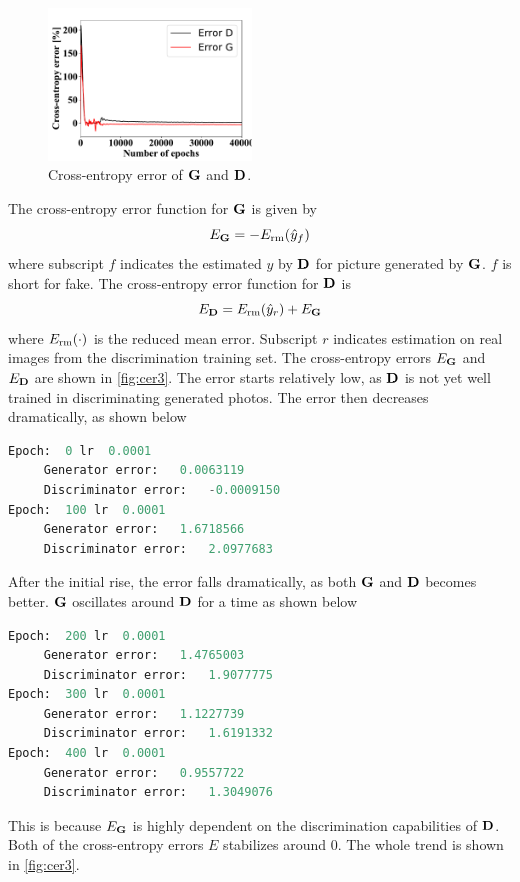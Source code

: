 \documentclass[../main.tex]{subfiles}
\begin{document}
\begin{figure}[t]
	\centering
    \includegraphics[width=0.48\textwidth]{figures/wgan/cross_entropy_error.pdf}
    \caption{Cross-entropy error of $\mathbf{G}$ and $\mathbf{D}$.}
    \label{fig:cer3}
\end{figure}

The cross-entropy error function for $\mathbf{G}$ is given by
\begin{equation}
	E_{\mathbf{G}} = -E_{\rm rm}(\hat y_{f})
\end{equation}
where subscript $f$ indicates the estimated $y$ by $\mathbf{D}$ for picture generated by $\mathbf{G}$. $f$ is short for fake. The cross-entropy error function for $\mathbf{D}$ is
\begin{equation}
	E_{\mathbf{D}} = E_{\rm rm}(\hat y_{r}) + E_{\mathbf{G}} \label{eq:E_d}
\end{equation}
where $E_{\rm rm}(\cdot)$ is the reduced mean error. Subscript $r$ indicates estimation on real images from the discrimination training set. The cross-entropy errors $E_{\mathbf{G}}$ and $E_{\mathbf{D}}$ are shown in \autoref{fig:cer3}. The error starts relatively low, as $\mathbf{D}$ is not yet well trained in discriminating generated photos. The error then decreases dramatically, as shown below
\begin{lstlisting}[language=Python]
Epoch:  0 lr  0.0001
	 Generator error:	0.0063119
	 Discriminator error:	-0.0009150
Epoch:  100 lr  0.0001
	 Generator error:	1.6718566
	 Discriminator error:	2.0977683
\end{lstlisting}
After the initial rise, the error falls dramatically, as both $\mathbf{G}$ and $\mathbf{D}$ becomes better. $\mathbf{G}$ oscillates around $\mathbf{D}$ for a time as shown below
\begin{lstlisting}[language=Python]
Epoch:  200 lr  0.0001
	 Generator error:	1.4765003
	 Discriminator error:	1.9077775
Epoch:  300 lr  0.0001
	 Generator error:	1.1227739
	 Discriminator error:	1.6191332
Epoch:  400 lr  0.0001
	 Generator error:	0.9557722
	 Discriminator error:	1.3049076
\end{lstlisting}
This is because $E_{\mathbf{G}}$ is highly dependent on the discrimination capabilities of $\mathbf{D}$. Both of the cross-entropy errors $E$ stabilizes around 0. The whole trend is shown in \autoref{fig:cer3}.
\end{document}

